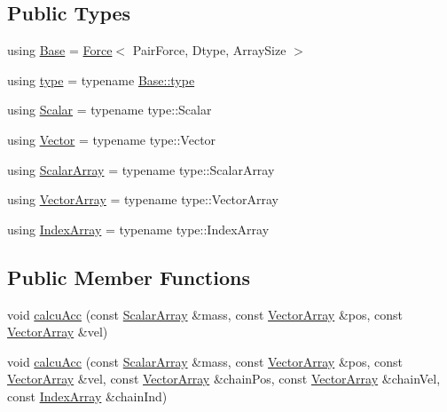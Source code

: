 \subsection*{Public Types}
\begin{DoxyCompactItemize}
\item 
using \mbox{\hyperlink{struct_space_h_1_1_vel_dep_force_a47a0c85f93ae37d3cce8f708df096c65}{Base}} = \mbox{\hyperlink{struct_space_h_1_1_force}{Force}}$<$ Pair\+Force, Dtype, Array\+Size $>$
\item 
using \mbox{\hyperlink{struct_space_h_1_1_vel_dep_force_a734e14a30f08b7c4bf6c8cd529c0bd1c}{type}} = typename \mbox{\hyperlink{struct_space_h_1_1_force_a151c6ae1ec7ad87825c2b6cc74aee5f2}{Base\+::type}}
\item 
using \mbox{\hyperlink{struct_space_h_1_1_vel_dep_force_abbc363fffee12f9e015fd4978c132aad}{Scalar}} = typename type\+::\+Scalar
\item 
using \mbox{\hyperlink{struct_space_h_1_1_vel_dep_force_a229c41eb710a16ec67978bb98c532622}{Vector}} = typename type\+::\+Vector
\item 
using \mbox{\hyperlink{struct_space_h_1_1_vel_dep_force_ae4efbb88779fc063293b7853184378ac}{Scalar\+Array}} = typename type\+::\+Scalar\+Array
\item 
using \mbox{\hyperlink{struct_space_h_1_1_vel_dep_force_ad2d0301ffff67a74018b92c17a3475de}{Vector\+Array}} = typename type\+::\+Vector\+Array
\item 
using \mbox{\hyperlink{struct_space_h_1_1_vel_dep_force_a81473a733ed71f51b81323c705283195}{Index\+Array}} = typename type\+::\+Index\+Array
\end{DoxyCompactItemize}
\subsection*{Public Member Functions}
\begin{DoxyCompactItemize}
\item 
void \mbox{\hyperlink{struct_space_h_1_1_vel_dep_force_af317008a8a1371f2a36f9b44835343f2}{calcu\+Acc}} (const \mbox{\hyperlink{struct_space_h_1_1_vel_dep_force_ae4efbb88779fc063293b7853184378ac}{Scalar\+Array}} \&mass, const \mbox{\hyperlink{struct_space_h_1_1_vel_dep_force_ad2d0301ffff67a74018b92c17a3475de}{Vector\+Array}} \&pos, const \mbox{\hyperlink{struct_space_h_1_1_vel_dep_force_ad2d0301ffff67a74018b92c17a3475de}{Vector\+Array}} \&vel)
\item 
void \mbox{\hyperlink{struct_space_h_1_1_vel_dep_force_a0c90022c26911e9471e9d340e512124b}{calcu\+Acc}} (const \mbox{\hyperlink{struct_space_h_1_1_vel_dep_force_ae4efbb88779fc063293b7853184378ac}{Scalar\+Array}} \&mass, const \mbox{\hyperlink{struct_space_h_1_1_vel_dep_force_ad2d0301ffff67a74018b92c17a3475de}{Vector\+Array}} \&pos, const \mbox{\hyperlink{struct_space_h_1_1_vel_dep_force_ad2d0301ffff67a74018b92c17a3475de}{Vector\+Array}} \&vel, const \mbox{\hyperlink{struct_space_h_1_1_vel_dep_force_ad2d0301ffff67a74018b92c17a3475de}{Vector\+Array}} \&chain\+Pos, const \mbox{\hyperlink{struct_space_h_1_1_vel_dep_force_ad2d0301ffff67a74018b92c17a3475de}{Vector\+Array}} \&chain\+Vel, const \mbox{\hyperlink{struct_space_h_1_1_vel_dep_force_a81473a733ed71f51b81323c705283195}{Index\+Array}} \&chain\+Ind)
\end{DoxyCompactItemize}
